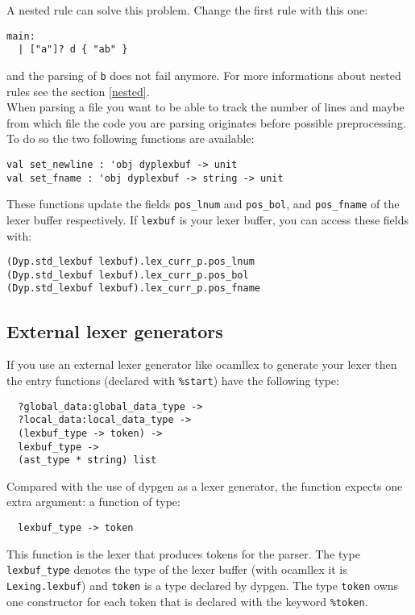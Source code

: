 \documentclass[12pt]{article}
\begin{document}
{A nested rule can solve this problem. Change the first rule with this one:
\begin{verbatim}
main:
  | ["a"]? d { "ab" }
\end{verbatim}
and the parsing of \verb|b| does not fail anymore. For more informations about nested rules see the section \ref{nested}.\\

When parsing a file you want to be able to track the number of lines and maybe from which file the code you are parsing originates before possible preprocessing. To do so the two following functions are available:
\begin{verbatim}
val set_newline : 'obj dyplexbuf -> unit
val set_fname : 'obj dyplexbuf -> string -> unit
\end{verbatim}
These functions update the fields \verb|pos_lnum| and \verb|pos_bol|, and \verb|pos_fname| of the lexer buffer respectively. If \verb|lexbuf| is your lexer buffer, you can access these fields with:
\begin{verbatim}
(Dyp.std_lexbuf lexbuf).lex_curr_p.pos_lnum
(Dyp.std_lexbuf lexbuf).lex_curr_p.pos_bol
(Dyp.std_lexbuf lexbuf).lex_curr_p.pos_fname
\end{verbatim}

\subsection{External lexer generators}\label{other-lexer}

If you use an external lexer generator like ocamllex to generate your lexer then the entry functions (declared with \verb|%start|) have the following type:
\begin{verbatim}
  ?global_data:global_data_type ->
  ?local_data:local_data_type ->
  (lexbuf_type -> token) ->
  lexbuf_type ->
  (ast_type * string) list
\end{verbatim}

Compared with the use of dypgen as a lexer generator, the function expects one extra argument: a function of type:
\begin{verbatim}
  lexbuf_type -> token
\end{verbatim}
This function is the lexer that produces tokens for the parser. The type \verb|lexbuf_type| denotes the type of the lexer buffer (with ocamllex it is \verb|Lexing.lexbuf|) and \verb|token| is a type declared by dypgen. The type \verb|token| owns one constructor for each token that is declared with the keyword \verb|%token|.\\

}
\end{document}
